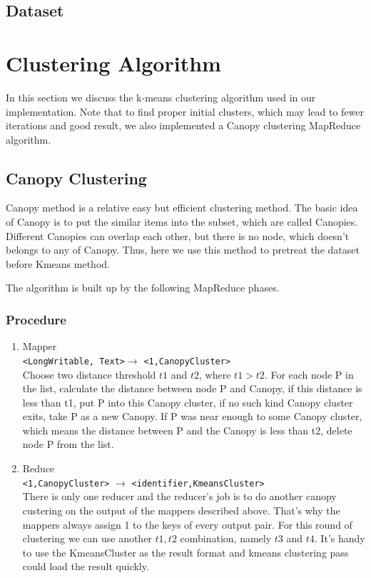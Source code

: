 \documentclass[a4paper,11pt]{article}
\begin{document}
\subsection{Dataset}

\section{Clustering Algorithm}
In this section we discuss the k-means clustering algorithm used in our
implementation. Note that to find proper initial clusters, which may lead to
fewer iterations and good result, we also implemented a Canopy clustering
MapReduce algorithm.
\subsection{Canopy Clustering}
Canopy method is a relative easy but efficient clustering method. The basic 
idea of Canopy is to put the similar items into the subset, which are called 
Canopies. Different Canopies can overlap each other, but there is no node, 
which doesn't belongs to any of Canopy. Thus, here we use this method to 
pretreat the dataset before Kmeans method. 

The algorithm is built up by the following MapReduce phases.
\subsubsection{Procedure}
\begin{enumerate}
  \item Mapper \\
      \verb|<LongWritable, Text>|$\rightarrow$ \verb|<1,CanopyCluster>|\\
      Choose two distance threshold $t1$ and $t2$, where $t1>t2$. For each  
      node P in the list, calculate the distance between node 
      P and Canopy, if this distance is less than t1, put P into this 
      Canopy cluster, if no such kind Canopy cluster exits, take P as a new 
      Canopy. If P was near enough to some Canopy cluster, which means the 
      distance   between P and the Canopy is less than t2, delete 
      node P from the list. 
  \item Reduce\\
    \verb|<1,CanopyCluster>|  $\rightarrow$   
    \verb|<identifier,KmeansCluster>| \\
     There is only one reducer and the reducer's job is to do another canopy 
     custering on the output of the mappers described above. That's why the 
     mappers always assign 1 to the keys of every output pair.
     For this round of clustering we can use another $t1,t2$ combination, 
     namely $t3$ and $t4$. 
     It's handy to use the KmeansCluster as the result format and kmeans 
     clustering pass could load the result quickly.
\end{enumerate}
\end{document}
